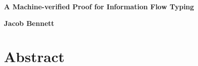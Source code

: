 \documentclass[12pt]{report}
\begin{document}

\newcommand{\insertnote}[3]{\noindent\textcolor{#1}{\textbf{#2:} #3}}
\newcommand{\joe}[1]{\insertnote{red}{JDT}{#1}}


\titleformat{\chapter}[display]
  {\normalfont\bfseries}{}{0pt}{\Huge}

\begin{titlepage}
\begin{center}

\begin{spacing}{1.5}
    \vspace*{\fill}
\end{spacing}

\begin{spacing}{2.5}
    \textbf{\Large A Machine-verified Proof for Information Flow Typing}\\[0.5cm]
    \vspace*{\fill}
\end{spacing}

\begin{spacing}{1.15}
    \textbf{\large Jacob Bennett}
    \date{}
\end{spacing}

\end{center}
\end{titlepage}

\setcounter{secnumdepth}{2}
\setcounter{tocdepth}{3}
\tableofcontents

\begin{coqdoccode}
\coqdocemptyline
\end{coqdoccode}

\section{Abstract}
\end{document}
